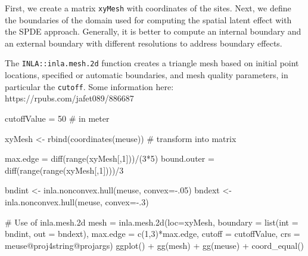 \documentclass[
  a4paper,
]{article}
\newenvironment{Shaded}{\begin{snugshade}}{\end{snugshade}}
\newcommand{\AttributeTok}[1]{\textcolor[rgb]{0.40,0.45,0.13}{#1}}
\newcommand{\CommentTok}[1]{\textcolor[rgb]{0.37,0.37,0.37}{#1}}
\newcommand{\DecValTok}[1]{\textcolor[rgb]{0.68,0.00,0.00}{#1}}
\newcommand{\FunctionTok}[1]{\textcolor[rgb]{0.28,0.35,0.67}{#1}}
\newcommand{\NormalTok}[1]{\textcolor[rgb]{0.00,0.23,0.31}{#1}}
\newcommand{\OtherTok}[1]{\textcolor[rgb]{0.00,0.23,0.31}{#1}}
\newcommand{\SpecialCharTok}[1]{\textcolor[rgb]{0.37,0.37,0.37}{#1}}
\begin{document}
First, we create a matrix \texttt{xyMesh} with coordinates of the sites.
Next, we define the boundaries of the domain used for computing the
spatial latent effect with the SPDE approach. Generally, it is better to
compute an internal boundary and an external boundary with different
resolutions to address boundary effects.

The \texttt{INLA::inla.mesh.2d} function creates a triangle mesh based
on initial point locations, specified or automatic boundaries, and mesh
quality parameters, in particular the \texttt{cutoff}. Some information
here: https://rpubs.com/jafet089/886687

\begin{Shaded}
\begin{Highlighting}[]
\NormalTok{cutoffValue }\OtherTok{=} \DecValTok{50} \CommentTok{\# in meter}

\NormalTok{xyMesh }\OtherTok{\textless{}{-}} \FunctionTok{rbind}\NormalTok{(}\FunctionTok{coordinates}\NormalTok{(meuse)) }\CommentTok{\# transform into matrix}

\NormalTok{max.edge }\OtherTok{=} \FunctionTok{diff}\NormalTok{(}\FunctionTok{range}\NormalTok{(xyMesh[,}\DecValTok{1}\NormalTok{]))}\SpecialCharTok{/}\NormalTok{(}\DecValTok{3}\SpecialCharTok{*}\DecValTok{5}\NormalTok{)}
\NormalTok{bound.outer }\OtherTok{=} \FunctionTok{diff}\NormalTok{(}\FunctionTok{range}\NormalTok{(}\FunctionTok{range}\NormalTok{(xyMesh[,}\DecValTok{1}\NormalTok{])))}\SpecialCharTok{/}\DecValTok{3}

\NormalTok{bndint }\OtherTok{\textless{}{-}} \FunctionTok{inla.nonconvex.hull}\NormalTok{(meuse, }\AttributeTok{convex=}\SpecialCharTok{{-}}\NormalTok{.}\DecValTok{05}\NormalTok{)}
\NormalTok{bndext }\OtherTok{\textless{}{-}} \FunctionTok{inla.nonconvex.hull}\NormalTok{(meuse, }\AttributeTok{convex=}\SpecialCharTok{{-}}\NormalTok{.}\DecValTok{3}\NormalTok{)}

\CommentTok{\# Use of inla.mesh.2d }
\NormalTok{mesh }\OtherTok{=} \FunctionTok{inla.mesh.2d}\NormalTok{(}\AttributeTok{loc=}\NormalTok{xyMesh,}
                    \AttributeTok{boundary =} \FunctionTok{list}\NormalTok{(}\AttributeTok{int =}\NormalTok{ bndint,}
                                    \AttributeTok{out =}\NormalTok{ bndext),}
                    \AttributeTok{max.edge =} \FunctionTok{c}\NormalTok{(}\DecValTok{1}\NormalTok{,}\DecValTok{3}\NormalTok{)}\SpecialCharTok{*}\NormalTok{max.edge, }
                    \AttributeTok{cutoff =}\NormalTok{ cutoffValue,}
                    \AttributeTok{crs =}\NormalTok{ meuse}\SpecialCharTok{@}\NormalTok{proj4string}\SpecialCharTok{@}\NormalTok{projargs)}
\FunctionTok{ggplot}\NormalTok{() }\SpecialCharTok{+}
  \FunctionTok{gg}\NormalTok{(mesh) }\SpecialCharTok{+}
  \FunctionTok{gg}\NormalTok{(meuse) }\SpecialCharTok{+}
  \FunctionTok{coord\_equal}\NormalTok{()}
\end{Highlighting}
\end{Shaded}
\end{document}
